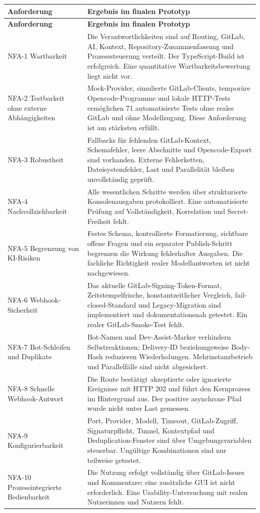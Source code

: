 \begin{longtable}{@{}>{\raggedright\arraybackslash}p{}>{\raggedright\arraybackslash}p{}@{}}
\toprule
\textbf{Anforderung} & \textbf{Ergebnis im finalen Prototyp} \\
\midrule
\endfirsthead
\toprule
\textbf{Anforderung} & \textbf{Ergebnis im finalen Prototyp} \\
\midrule
\endhead
NFA-1 Wartbarkeit & Die Verantwortlichkeiten sind auf Routing, GitLab, AI, Kontext, Repository-Zusammenfassung und Prozesssteuerung verteilt. Der TypeScript-Build ist erfolgreich. Eine quantitative Wartbarkeitsbewertung liegt nicht vor. \\
NFA-2 Testbarkeit ohne externe Abhängigkeiten & Mock-Provider, simulierte GitLab-Clients, temporäre Opencode-Programme und lokale HTTP-Tests ermöglichen 71 automatisierte Tests ohne reales GitLab und ohne Modellzugang. Diese Anforderung ist am stärksten erfüllt. \\
NFA-3 Robustheit & Fallbacks für fehlenden GitLab-Kontext, Schemafehler, leere Abschnitte und Opencode-Export sind vorhanden. Externe Fehlerketten, Dateisystemfehler, Last und Parallelität bleiben unvollständig geprüft. \\
NFA-4 Nachvollziehbarkeit & Alle wesentlichen Schritte werden über strukturierte Konsolenausgaben protokolliert. Eine automatisierte Prüfung auf Vollständigkeit, Korrelation und Secret-Freiheit fehlt. \\
NFA-5 Begrenzung von KI-Risiken & Festes Schema, kontrollierte Formatierung, sichtbare offene Fragen und ein separater Publish-Schritt begrenzen die Wirkung fehlerhafter Ausgaben. Die fachliche Richtigkeit realer Modellantworten ist nicht nachgewiesen. \\
NFA-6 Webhook-Sicherheit & Das aktuelle GitLab-Signing-Token-Format, Zeitstempelfrische, konstantzeitlicher Vergleich, fail-closed-Standard und Legacy-Migration sind implementiert und dokumentationsnah getestet. Ein realer GitLab-Smoke-Test fehlt. \\
NFA-7 Bot-Schleifen und Duplikate & Bot-Namen und Dev-Assist-Marker verhindern Selbstreaktionen; Delivery-ID beziehungsweise Body-Hash reduzieren Wiederholungen. Mehrinstanzbetrieb und Parallelfälle sind nicht abgesichert. \\
NFA-8 Schnelle Webhook-Antwort & Die Route bestätigt akzeptierte oder ignorierte Ereignisse mit HTTP 202 und führt den Kernprozess im Hintergrund aus. Der positive asynchrone Pfad wurde nicht unter Last gemessen. \\
NFA-9 Konfigurierbarkeit & Port, Provider, Modell, Timeout, GitLab-Zugriff, Signaturpflicht, Tunnel, Kontextpfad und Deduplication-Fenster sind über Umgebungsvariablen steuerbar. Ungültige Kombinationen sind nur teilweise getestet. \\
NFA-10 Prozessintegrierte Bedienbarkeit & Die Nutzung erfolgt vollständig über GitLab-Issues und Kommentare; eine zusätzliche GUI ist nicht erforderlich. Eine Usability-Untersuchung mit realen Nutzerinnen und Nutzern fehlt. \\
\bottomrule
\end{longtable}

